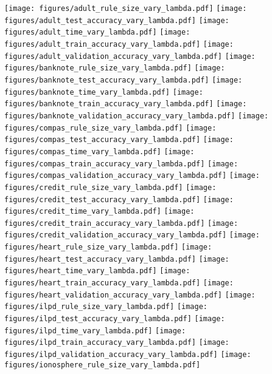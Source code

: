 \begin{figure*}[t]
\texttt{[image: figures/adult\_rule\_size\_vary\_lambda.pdf]}
\texttt{[image: figures/adult\_test\_accuracy\_vary\_lambda.pdf]}
\texttt{[image: figures/adult\_time\_vary\_lambda.pdf]}
\texttt{[image: figures/adult\_train\_accuracy\_vary\_lambda.pdf]}
\texttt{[image: figures/adult\_validation\_accuracy\_vary\_lambda.pdf]}
\texttt{[image: figures/banknote\_rule\_size\_vary\_lambda.pdf]}
\texttt{[image: figures/banknote\_test\_accuracy\_vary\_lambda.pdf]}
\texttt{[image: figures/banknote\_time\_vary\_lambda.pdf]}
\texttt{[image: figures/banknote\_train\_accuracy\_vary\_lambda.pdf]}
\texttt{[image: figures/banknote\_validation\_accuracy\_vary\_lambda.pdf]}
\texttt{[image: figures/compas\_rule\_size\_vary\_lambda.pdf]}
\texttt{[image: figures/compas\_test\_accuracy\_vary\_lambda.pdf]}
\texttt{[image: figures/compas\_time\_vary\_lambda.pdf]}
\texttt{[image: figures/compas\_train\_accuracy\_vary\_lambda.pdf]}
\texttt{[image: figures/compas\_validation\_accuracy\_vary\_lambda.pdf]}
\texttt{[image: figures/credit\_rule\_size\_vary\_lambda.pdf]}
\texttt{[image: figures/credit\_test\_accuracy\_vary\_lambda.pdf]}
\texttt{[image: figures/credit\_time\_vary\_lambda.pdf]}
\texttt{[image: figures/credit\_train\_accuracy\_vary\_lambda.pdf]}
\texttt{[image: figures/credit\_validation\_accuracy\_vary\_lambda.pdf]}
\texttt{[image: figures/heart\_rule\_size\_vary\_lambda.pdf]}
\texttt{[image: figures/heart\_test\_accuracy\_vary\_lambda.pdf]}
\texttt{[image: figures/heart\_time\_vary\_lambda.pdf]}
\texttt{[image: figures/heart\_train\_accuracy\_vary\_lambda.pdf]}
\texttt{[image: figures/heart\_validation\_accuracy\_vary\_lambda.pdf]}
\texttt{[image: figures/ilpd\_rule\_size\_vary\_lambda.pdf]}
\texttt{[image: figures/ilpd\_test\_accuracy\_vary\_lambda.pdf]}
\texttt{[image: figures/ilpd\_time\_vary\_lambda.pdf]}
\texttt{[image: figures/ilpd\_train\_accuracy\_vary\_lambda.pdf]}
\texttt{[image: figures/ilpd\_validation\_accuracy\_vary\_lambda.pdf]}
\texttt{[image: figures/ionosphere\_rule\_size\_vary\_lambda.pdf]}

\end{figure*}
